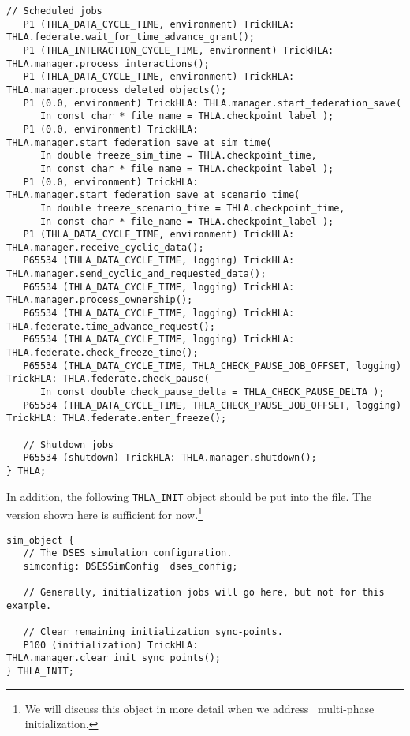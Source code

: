 \begin{lstlisting}[caption={The {\tt THLA sim\_object}},label={list:THLA-sim-object}]
   // Scheduled jobs
   P1 (THLA_DATA_CYCLE_TIME, environment) TrickHLA: THLA.federate.wait_for_time_advance_grant();
   P1 (THLA_INTERACTION_CYCLE_TIME, environment) TrickHLA: THLA.manager.process_interactions();
   P1 (THLA_DATA_CYCLE_TIME, environment) TrickHLA: THLA.manager.process_deleted_objects();
   P1 (0.0, environment) TrickHLA: THLA.manager.start_federation_save(
      In const char * file_name = THLA.checkpoint_label );
   P1 (0.0, environment) TrickHLA: THLA.manager.start_federation_save_at_sim_time(
      In double freeze_sim_time = THLA.checkpoint_time,
      In const char * file_name = THLA.checkpoint_label );
   P1 (0.0, environment) TrickHLA: THLA.manager.start_federation_save_at_scenario_time(
      In double freeze_scenario_time = THLA.checkpoint_time,
      In const char * file_name = THLA.checkpoint_label );
   P1 (THLA_DATA_CYCLE_TIME, environment) TrickHLA: THLA.manager.receive_cyclic_data();
   P65534 (THLA_DATA_CYCLE_TIME, logging) TrickHLA: THLA.manager.send_cyclic_and_requested_data();
   P65534 (THLA_DATA_CYCLE_TIME, logging) TrickHLA: THLA.manager.process_ownership();
   P65534 (THLA_DATA_CYCLE_TIME, logging) TrickHLA: THLA.federate.time_advance_request();
   P65534 (THLA_DATA_CYCLE_TIME, logging) TrickHLA: THLA.federate.check_freeze_time();
   P65534 (THLA_DATA_CYCLE_TIME, THLA_CHECK_PAUSE_JOB_OFFSET, logging) TrickHLA: THLA.federate.check_pause( 
      In const double check_pause_delta = THLA_CHECK_PAUSE_DELTA );
   P65534 (THLA_DATA_CYCLE_TIME, THLA_CHECK_PAUSE_JOB_OFFSET, logging) TrickHLA: THLA.federate.enter_freeze();

   // Shutdown jobs
   P65534 (shutdown) TrickHLA: THLA.manager.shutdown();
} THLA;
\end{lstlisting}

In addition, the following {\tt THLA\_INIT} object should be put
into the \sdefine file.
The version shown here is sufficient for now.\footnote{
  We will discuss this object in more detail when we address
  \TrickHLA\ multi-phase initialization.
}

\begin{lstlisting}[caption={The {\tt THLA\_INIT sim\_object}},label={list:THLA-INIT-sim-object}]
sim_object {
   // The DSES simulation configuration.
   simconfig: DSESSimConfig  dses_config;

   // Generally, initialization jobs will go here, but not for this example.
   
   // Clear remaining initialization sync-points.
   P100 (initialization) TrickHLA: THLA.manager.clear_init_sync_points();
} THLA_INIT;
\end{lstlisting}

